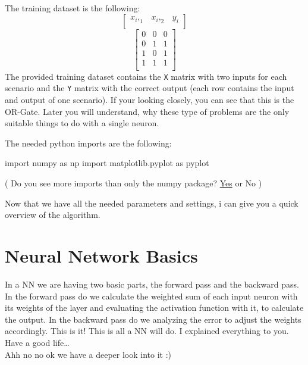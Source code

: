\documentclass[
]{book}
\newenvironment{Shaded}{\begin{snugshade}}{\end{snugshade}}
\newcommand{\ImportTok}[1]{#1}
\newcommand{\NormalTok}[1]{#1}
\begin{document}
The training dataset is the following:
\[
\left[
\begin{array}{cc|c}
x_i,_1 & x_i,_2 & y_i \\
\end{array}
\right]
\]
\[
\left[
\begin{array}{cc|c}
0 & 0 & 0 \\
0 & 1 & 1 \\
1 & 0 & 1 \\
1 & 1 & 1 \\
\end{array}
\right]
\]
The provided training dataset contains the \texttt{X} matrix with two inputs for each scenario and the \texttt{Y} matrix with the correct output (each row contains the input and output of one scenario). If your looking closely, you can see that this is the OR-Gate. Later you will understand, why these type of problems are the only suitable things to do with a single neuron.

The needed python imports are the following:

\begin{Shaded}
\begin{Highlighting}[]
\ImportTok{import}\NormalTok{ numpy }\ImportTok{as}\NormalTok{ np}
\ImportTok{import}\NormalTok{ matplotlib.pyplot }\ImportTok{as}\NormalTok{ pyplot}
\end{Highlighting}
\end{Shaded}

( Do you see more imports than only the numpy package? \href{https://www.youtube.com/watch?v=dQw4w9WgXcQ}{Yes} or No )

Now that we have all the needed parameters and settings, i can give you a quick overview of the algorithm.

\hypertarget{neural-network-basics}{%
\section{Neural Network Basics}\label{neural-network-basics}}

In a NN we are having two basic parts, the forward pass and the backward pass. In the forward pass do we calculate the weighted sum of each input neuron with its weights of the layer and evaluating the activation function with it, to calculate the output. In the backward pass do we analyzing the error to adjust the weights accordingly. This is it! This is all a NN will do. I explained everything to you. Have a good life\ldots{}\\
Ahh no no ok we have a deeper look into it :)
\end{document}
